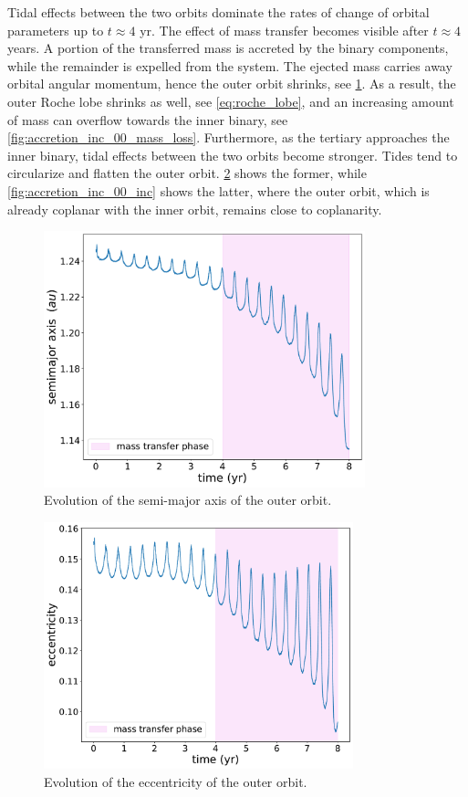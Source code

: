 Tidal effects between the two orbits dominate the rates of change of orbital parameters up to $t \approx 4$ yr. The effect of mass transfer becomes visible after $t \approx 4$ years. A portion of the transferred mass is accreted by the binary components, while the remainder is expelled from the system.  The ejected mass carries away orbital angular momentum, hence the outer orbit shrinks, see \cref{fig:accretion_inc_00_outer_semimajor_axis}. As a result,  the outer Roche lobe shrinks as well, see \cref{eq:roche_lobe}, and an increasing amount of mass can overflow towards the inner binary, see \cref{fig:accretion_inc_00_mass_loss}. Furthermore, as the tertiary approaches the inner binary, tidal effects between the two orbits become stronger. Tides tend to circularize and flatten the outer orbit. \cref{fig:accretion_inc_00_outer_ecc} shows the former, while \cref{fig:accretion_inc_00_inc} shows the latter, where the outer orbit, which is already coplanar with the inner orbit, remains close to coplanarity.
\begin{figure}[H]
    \centering
    \includegraphics[width=0.83\textwidth]{Thesis/graphs/inc_00/accretion_outer_inc_00_semimajor_axis.pdf}
    \caption{Evolution of the semi-major axis of the outer orbit.}
    \label{fig:accretion_inc_00_outer_semimajor_axis}
\end{figure}
\begin{figure}[H]
    \centering
    \includegraphics[width=0.8\textwidth]{Thesis/graphs/inc_00/accretion_inc_00_outer_ecc.pdf}
    \caption{Evolution of the eccentricity of the outer orbit.}
    \label{fig:accretion_inc_00_outer_ecc}
\end{figure}
